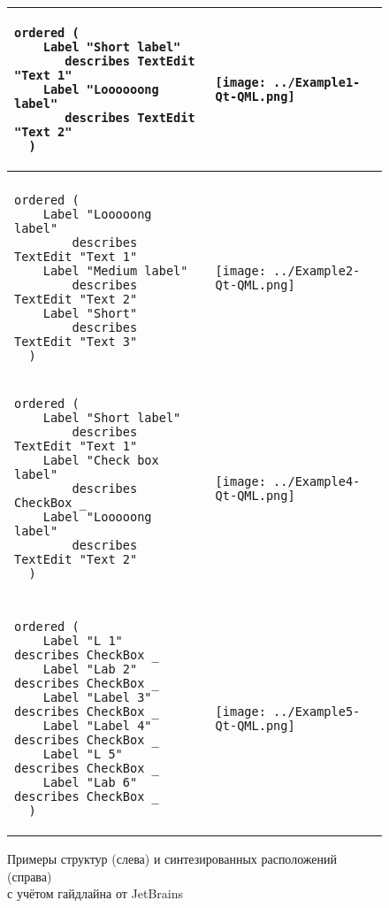 \begin{figure*}
    \begin{tabular}{m{95mm}m{5cm}}
      \begin{lstlisting}[basicstyle=\small]
  ordered (
    Label "Short label"
       describes TextEdit "Text 1"
    Label "Loooooong label"
       describes TextEdit "Text 2"
  )
      \end{lstlisting} &
      \texttt{[image: ../Example1-Qt-QML.png]} \\
      \hline\\
      \begin{lstlisting}[basicstyle=\small]
  ordered (
    Label "Looooong label"
        describes TextEdit "Text 1"
    Label "Medium label"
        describes TextEdit "Text 2"
    Label "Short"
        describes TextEdit "Text 3"
  )
      \end{lstlisting} &
      \texttt{[image: ../Example2-Qt-QML.png]} \\
      \hline
      \begin{lstlisting}[basicstyle=\small]
  ordered (
    Label "Short label"
        describes TextEdit "Text 1"
    Label "Check box label"
        describes CheckBox _
    Label "Looooong label"
        describes TextEdit "Text 2"
  )
      \end{lstlisting} &
      \vspace{1em}\texttt{[image: ../Example4-Qt-QML.png]} \\
      \hline\\
      \begin{lstlisting}[basicstyle=\small]
  ordered (
    Label "L 1"     describes CheckBox _
    Label "Lab 2"   describes CheckBox _
    Label "Label 3" describes CheckBox _
    Label "Label 4" describes CheckBox _
    Label "L 5"     describes CheckBox _
    Label "Lab 6"   describes CheckBox _
  )
      \end{lstlisting} &
      \texttt{[image: ../Example5-Qt-QML.png]} \\
    \end{tabular}
    \caption{Примеры структур (слева) и синтезированных расположений (справа)\\
      с учётом гайдлайна от  JetBrains}
    \label{fig:evaluation}
  \end{figure*}
